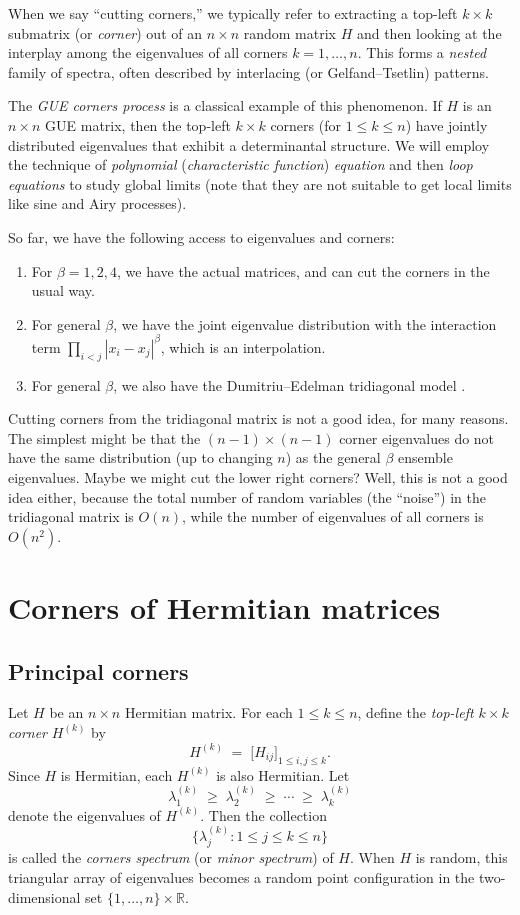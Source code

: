 \documentclass[letterpaper,11pt,oneside,reqno]{book}
\numberwithin{equation}{chapter}  %
\theoremstyle{definition}
\begin{document}
When we say ``cutting corners,'' we typically refer to extracting a top-left $k\times k$ submatrix (or \emph{corner}) out of an $n\times n$ random matrix $H$ and then looking at the interplay among the eigenvalues of all corners $k=1,\dots,n$. This forms a \emph{nested} family of spectra, often described by interlacing (or Gelfand--Tsetlin) patterns.

The \emph{GUE corners process} is a classical example of
this phenomenon. If $H$ is an $n\times n$ GUE matrix, then
the top-left $k\times k$ corners (for $1\le k\le n$) have
jointly distributed eigenvalues that exhibit a
determinantal structure. We will employ the
technique of \emph{polynomial} (\emph{characteristic function}) \emph{equation} and
then \emph{loop equations} to study global limits
(note that they are not suitable to get local limits like sine and Airy processes).

So far, we have the following access to eigenvalues and corners:
\begin{enumerate}
	\item For $\beta=1,2,4$, we have the actual matrices,
		and can cut the corners in the usual way.
	\item For general $\beta$, we have the joint eigenvalue distribution
		with the interaction term $\prod_{i<j}|x_i-x_j|^\beta$, which is an interpolation.
	\item For general $\beta$, we also have the Dumitriu--Edelman
		tridiagonal model \cite{dumitriu2002matrix}.
\end{enumerate}
Cutting corners from the tridiagonal matrix is not a good idea, for many reasons.
The simplest might be that the $(n-1)\times (n-1)$ corner
eigenvalues do not have the same distribution (up to changing $n$) as the
general $\beta$ ensemble eigenvalues. Maybe we might cut the lower right corners?
Well, this is not a good idea either, because the total number of random variables
(the ``noise'') in the tridiagonal matrix is $O(n)$, while the number of eigenvalues
of all corners is $O(n^2)$.

\section{Corners of Hermitian matrices}
\label{lecture7:sec:corners-definition}

\subsection{Principal corners}
Let $H$ be an $n\times n$ Hermitian matrix. For each $1\le k\le n$, define the \emph{top-left $k\times k$ corner} $H^{(k)}$ by
\[
	H^{(k)} \;=\; \bigl[H_{ij}\bigr]_{1\le i,j \le k}.
\]
Since $H$ is Hermitian, each $H^{(k)}$ is also Hermitian. Let
\[
	\lambda_1^{(k)} \;\ge\;\lambda_2^{(k)}\;\ge\;\cdots\;\ge\;\lambda_k^{(k)}
\]
denote the eigenvalues of $H^{(k)}$. Then the collection
\[
	\bigl\{\lambda_j^{(k)} : 1\le j\le k \le n\bigr\}
\]
is called the \emph{corners spectrum} (or \emph{minor
spectrum}) of $H$. When $H$ is random, this triangular array
of eigenvalues becomes a random point configuration in the
two-dimensional set $\{1,\dots,n\}\times \mathbb{R}$.
\end{document}
